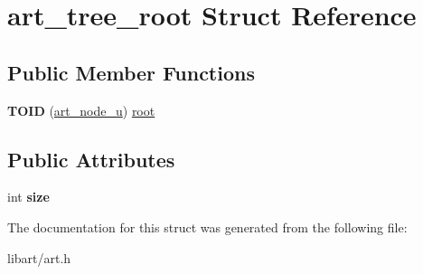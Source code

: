 \hypertarget{structart__tree__root}{}\section{art\+\_\+tree\+\_\+root Struct Reference}
\label{structart__tree__root}
\subsection*{Public Member Functions}
\begin{DoxyCompactItemize}
\item 
\mbox{\label{structart__tree__root_a2bbd25a5cc17e803418d9963fef257cf}} 
{\bfseries T\+O\+ID} (\hyperlink{struct__art__node__u}{art\+\_\+node\+\_\+u}) \hyperlink{structroot}{root}
\end{DoxyCompactItemize}
\subsection*{Public Attributes}
\begin{DoxyCompactItemize}
\item 
\mbox{\label{structart__tree__root_a400af60db816e51e1f02df9f0d9b345d}} 
int {\bfseries size}
\end{DoxyCompactItemize}


The documentation for this struct was generated from the following file\+:\begin{DoxyCompactItemize}
\item 
libart/art.\+h\end{DoxyCompactItemize}
